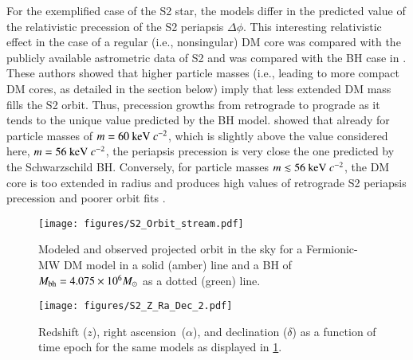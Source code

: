 \documentclass[twocolumn]{aa}
\begin{document}
For the exemplified case of the S2 star, the models differ in the predicted value of the relativistic precession of the S2 periapsis $\Delta \phi$. This interesting relativistic effect in the case of a regular (i.e., nonsingular) DM core was compared with the publicly available astrometric data of S2 and was compared with the BH case in \cite{2022MNRAS.511L..35A}. These authors showed that higher particle masses (i.e., leading to more compact DM cores, as detailed in the section below) imply that less extended DM mass fills the S2 orbit. Thus, precession growths from retrograde to prograde as it tends to the unique value predicted by the BH model. \cite{2022MNRAS.511L..35A} showed that already for particle masses of $m = 60~{\rm keV}~c^{-2}$, which is slightly above the value considered here, $m=56~{\rm keV}~c^{-2}$, the periapsis precession is very close the one predicted by the Schwarzschild BH. Conversely, for particle masses $m\lesssim 56~{\rm keV}~c^{-2}$, the DM core is too extended in radius and produces high values of retrograde S2 periapsis precession and poorer orbit fits \citep{2020A&A...641A..34B,2022MNRAS.511L..35A}. %
%
%
\begin{figure}
   \texttt{[image: figures/S2\_Orbit\_stream.pdf]}
\caption{Modeled and observed projected orbit in the sky for a Fermionic-MW DM model in a solid (amber) line and a BH of $M_{\rm bh}=4.075\times 10^6 M_\odot$ as a dotted (green) line.}
   \label{fig:S2_fit}
\end{figure}

\begin{figure}
   \texttt{[image: figures/S2\_Z\_Ra\_Dec\_2.pdf]}
   \caption{Redshift ($z$), right ascension~($\alpha$), and declination ($\delta$) as a function of time epoch for the same models as
   displayed in \cref{fig:S2_fit}.}
   \label{fig:S2_fit_b}
\end{figure}
\end{document}
